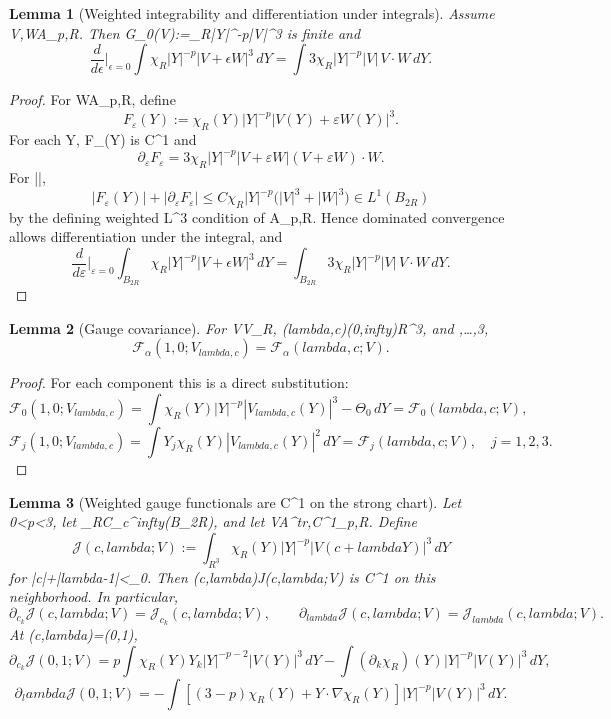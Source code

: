 \documentclass[11pt]{amsart}
\def\({}%
\def\){}%
\def\mathrm#1{#1}%
\def\mathbb#1{#1}%
\def\lambda{lambda}%
\def\infty{infty}%
\theoremstyle{plain}
\newtheorem{lemma}[lemma]{Lemma}
\theoremstyle{definition}
\theoremstyle{remark}
\newcommand{\dd}{\mathrm d}
\newcommand{\RR}{\mathbb R}
\begin{document}
\begin{lemma}[Weighted integrability and differentiation under integrals]\label{paper2:lem:weighted-finite}
Assume \(V,W\in\mathcal A_{p,R}\). Then \(G_0(V):=\int\chi_R|Y|^{-p}|V|^3\)
is finite and
\[
\frac{\dd}{\dd\epsilon}\Big|_{\epsilon=0}
\int \chi_R|Y|^{-p}|V+\epsilon W|^3\,\dd Y
=\int 3\chi_R|Y|^{-p}|V|\,V\cdot W\,\dd Y.
\]
\end{lemma}
\begin{proof}
For \(W\in\mathcal A_{p,R}\), define
\[
F_\varepsilon(Y):=\chi_R(Y)|Y|^{-p}|V(Y)+\varepsilon W(Y)|^3.
\]
For each \(Y\), \(\varepsilon\mapsto F_\varepsilon(Y)\) is \(C^1\) and
\[
\partial_\varepsilon F_\varepsilon
=3\chi_R|Y|^{-p}|V+\varepsilon W|(V+\varepsilon W)\cdot W.
\]
For \(|\varepsilon|\),
\[
|F_\varepsilon(Y)|+|\partial_\varepsilon F_\varepsilon|
\le C\chi_R|Y|^{-p}\bigl(|V|^3+|W|^3\bigr)\in L^1(B_{2R})
\]
by the defining weighted \(L^3\) condition of \(\mathcal A_{p,R}\).
Hence dominated convergence allows differentiation under the integral, and
\[
\frac{\dd}{\dd\varepsilon}\Big|_{\varepsilon=0}\int_{B_{2R}}\chi_R|Y|^{-p}|V+\epsilon W|^3\,\dd Y
=\int_{B_{2R}}3\chi_R|Y|^{-p}|V|\,V\cdot W\,\dd Y.
\]
\end{proof}

\begin{lemma}[Gauge covariance]\label{paper2:lem:gauge-covariance}
For \(V\in\mathcal V_R\), \((\lambda,c)\in(0,\infty)\times\RR^3\), and
\(,\dots,3\),
\[
\mathcal F_\alpha(1,0;V_{\lambda,c})=\mathcal F_\alpha(\lambda,c;V).
\]
\end{lemma}

\begin{proof}
For each component this is a direct substitution:
\[
\mathcal F_0(1,0;V_{\lambda,c})
=\int\chi_R(Y)|Y|^{-p}|V_{\lambda,c}(Y)|^3-\Theta_0\,\dd Y
=\mathcal F_0(\lambda,c;V),
\]
\[
\mathcal F_j(1,0;V_{\lambda,c})
=\int Y_j\chi_R(Y)|V_{\lambda,c}(Y)|^2\,\dd Y
=\mathcal F_j(\lambda,c;V),\quad j=1,2,3.
\]
\end{proof}

\begin{lemma}[Weighted gauge functionals are \(C^1\) on the strong chart]
\label{paper2:lem:weighted-gauge-C1-strong-chart}
\label{paper2:lem:weighted-translation-differentiability}
Let \(0<p<3\), let \(\chi_R\in C_c^\infty(B_{2R})\), and let
\(V\in\mathcal A^{\rm tr,C^1}_{p,R}\).  Define
\[
   \mathcal J(c,\lambda;V)
   :=
   \int_{\RR^3}\chi_R(Y)|Y|^{-p}|V(c+\lambda Y)|^3\,dY
\]
for \(|c|+|\lambda-1|<\delta_0\).  Then \((c,\lambda)\mapsto\mathcal J(c,\lambda;V)\)
is \(C^1\) on this neighborhood.  In particular,
\[
\partial_{c_k}\mathcal J(c,\lambda;V)
=
\mathcal J_{c_k}(c,\lambda;V),
\qquad
\partial_{\lambda}\mathcal J(c,\lambda;V)
=
\mathcal J_{\lambda}(c,\lambda;V).
\]
At \((c,\lambda)=(0,1)\),
\[
\partial_{c_k}\mathcal J(0,1;V)
=
 p\int \chi_R(Y)Y_k|Y|^{-p-2}|V(Y)|^3\,dY
-
 \int (\partial_k\chi_R)(Y)|Y|^{-p}|V(Y)|^3\,dY,
\]
\[
\partial_\lambda \mathcal J(0,1;V)
=
-\int \left[(3-p)\chi_R(Y)+Y\cdot\nabla\chi_R(Y)\right]
|Y|^{-p}|V(Y)|^3\,dY.
\]
\end{lemma}
\end{document}
